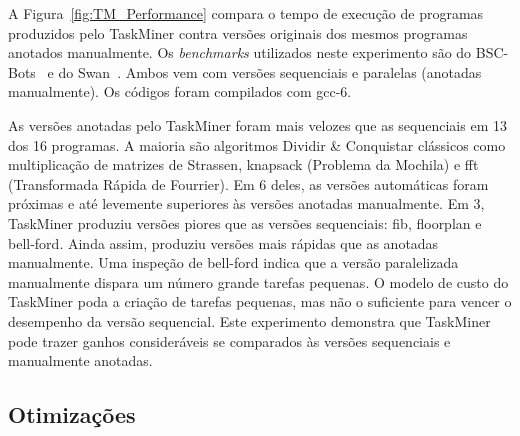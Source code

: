 \documentclass[sigplan,10pt]{acmart}
\newcommand\Taskminer{\mbox{\textsf{TaskMiner}}}
\begin{document}
A Figura~\ref{fig:TM_Performance} compara o tempo de execução de programas produzidos
pelo {\Taskminer} contra versões originais dos mesmos programas anotados manualmente.
Os {\em benchmarks} utilizados neste experimento são do \textsf{BSC-Bots}~\cite{Duran09} 
e do \textsf{Swan}~\cite{Moreira17}.
Ambos vem com versões sequenciais e paralelas (anotadas manualmente). Os códigos foram compilados
com gcc-6.

As versões anotadas pelo \Taskminer{} foram mais velozes que as sequenciais em 13 dos 16 programas.
A maioria são algoritmos Dividir \& Conquistar clássicos como multiplicação de matrizes de \textsf{Strassen},
 \textsf{knapsack} (Problema da Mochila) e \textsf{fft} (Transformada Rápida de Fourrier). Em 6 deles, as versões automáticas foram próximas e até
levemente superiores às versões anotadas manualmente. Em 3, \Taskminer{} produziu versões piores que
as versões sequenciais: \textsf{fib}, \textsf{floorplan} e \textsf{bell-ford}. Ainda assim, produziu versões
mais rápidas que as anotadas manualmente. Uma inspeção de \textsf{bell-ford} indica que a versão
paralelizada manualmente dispara um número grande tarefas pequenas. O modelo de custo
do \Taskminer{} poda a criação de tarefas pequenas, mas não o suficiente para vencer o desempenho
da versão sequencial. Este experimento demonstra que \Taskminer{} pode trazer
ganhos consideráveis se comparados às versões sequenciais e manualmente anotadas.

\subsection{Otimizações}
\label{sub:optimizations}
\end{document}
